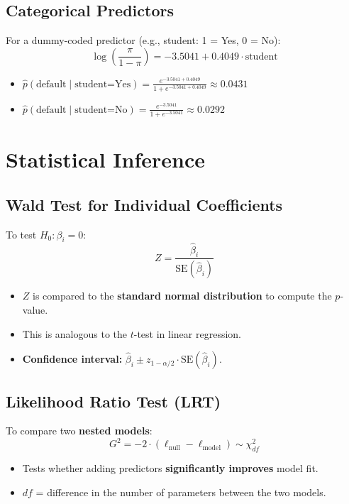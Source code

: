 \documentclass{article}
\begin{document}
\subsection{Categorical Predictors}
For a dummy-coded predictor (e.g., student: 1 = Yes, 0 = No):
$$\log\left(\frac{\pi}{1 - \pi}\right) = -3.5041 + 0.4049 \cdot \text{student}$$
\begin{itemize}
    \item $\hat{p}(\text{default} \mid \text{student=Yes}) = \frac{e^{-3.5041 + 0.4049}}{1 + e^{-3.5041 + 0.4049}} \approx 0.0431$
    \item $\hat{p}(\text{default} \mid \text{student=No}) = \frac{e^{-3.5041}}{1 + e^{-3.5041}} \approx 0.0292$
\end{itemize}

\newpage
\section{Statistical Inference}

\subsection{Wald Test for Individual Coefficients}
To test $H_0: \beta_i = 0$:
$$Z = \frac{\hat{\beta}_i}{\text{SE}(\hat{\beta}_i)}$$
\begin{itemize}
    \item $Z$ is compared to the \textbf{standard normal distribution} to compute the $p$-value.
    \item This is analogous to the $t$-test in linear regression.
    \item \textbf{Confidence interval:} $\hat{\beta}_i \pm z_{1-\alpha/2} \cdot \text{SE}(\hat{\beta}_i)$.
\end{itemize}

\subsection{Likelihood Ratio Test (LRT)}
To compare two \textbf{nested models}:
$$G^2 = -2 \cdot (\ell_{\text{null}} - \ell_{\text{model}}) \sim \chi^2_{df}$$
\begin{itemize}
    \item Tests whether adding predictors \textbf{significantly improves} model fit.
    \item $df$ = difference in the number of parameters between the two models.
\end{itemize}
\end{document}
